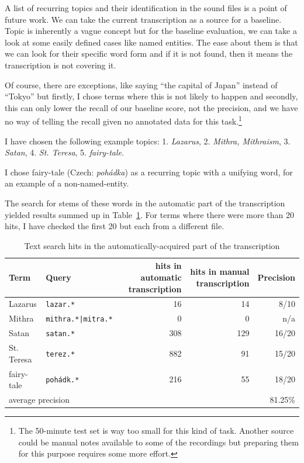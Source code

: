 \documentclass[a4paper,11pt]{article}
\begin{document}
A list of recurring topics and their identification in the sound files is a
point of future work.
We can take the current transcription %
as a source for a baseline.
Topic is inherently a vague concept %
but for the baseline evaluation, we can take a look at some easily defined cases
like named entities. The ease about them is that we can look for their specific
word form and if it is not found, then it means the transcription is not
covering it.

Of course, there are exceptions, like saying ``the capital of Japan'' instead of
``Tokyo'' but firstly, I chose terms where this is not likely to happen and
secondly, this can only lower the recall of our baseline score, not the
precision, and we have no way of telling the recall given no annotated data
for this task.\footnote{The 50-minute test set is way too small for this kind of
task. Another source could be manual notes available to some of the recordings
but preparing them for this purpose requires some more effort.}

I have chosen the following example topics:
1. \emph{Lazarus},
2. \emph{Mithra, Mithraism},
3. \emph{Satan},
4. \emph{St. Teresa},
5. \emph{fairy-tale}.

I chose fairy-tale (Czech: \emph{poh\'{a}dka}) as a recurring topic with a
unifying word, for an example of a non-named-entity.

The search for stems of these words in the automatic part of the transcription
yielded results summed up in Table~\ref{tab:topicsearch}. For terms where there
were more than 20 hits, I have checked the first 20 but each from a different
file.

\begin{table}[htpb]
\begin{center}
\begin{tabular}{|l|l|r|r|r|}
\hline
Term & Query & hits in automatic transcription & hits in manual transcription & Precision \\
\hline
Lazarus & \texttt{lazar.*} & 16 & 14 & 8/10   \\
Mithra & \texttt{mithra.*|mitra.*} & 0 & 0 & n/a   \\
Satan & \texttt{satan.*} & 308 & 129 & 16/20   \\
St. Teresa & \texttt{terez.*} & 882 & 91 & 15/20   \\
fairy-tale & \texttt{pohádk.*} & 216 & 55 & 18/20   \\
\hline
\multicolumn{4}{|l|}{average precision} & 81.25\%\\
\hline
\end{tabular}
\caption{Text search hits in the automatically-acquired part of the
transcription}\label{tab:topicsearch}
\end{center}
\end{table}
\end{document}
